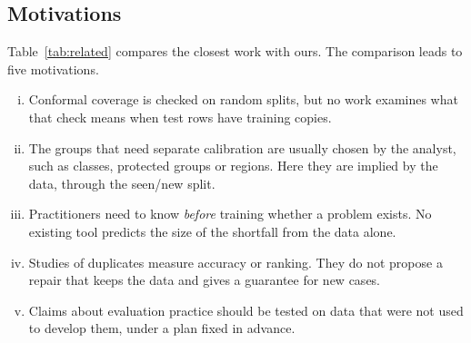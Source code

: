 \subsection{Motivations}
Table~\ref{tab:related} compares the closest work with ours. The comparison leads to five motivations.
\begin{enumerate}[(i)]
\item Conformal coverage is checked on random splits, but no work examines what that check means when test rows have training copies.
\item The groups that need separate calibration are usually chosen by the analyst, such as classes, protected groups or regions. Here they are implied by the data, through the seen/new split.
\item Practitioners need to know \emph{before} training whether a problem exists. No existing tool predicts the size of the shortfall from the data alone.
\item Studies of duplicates measure accuracy or ranking. They do not propose a repair that keeps the data and gives a guarantee for new cases.
\item Claims about evaluation practice should be tested on data that were not used to develop them, under a plan fixed in advance.
\end{enumerate}

